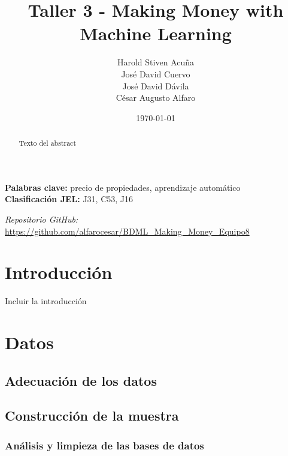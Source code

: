 \documentclass[12pt,a4paper,onecolumn]{article}
\title{\textbf{Taller 3 - Making Money with Machine Learning}}
\author{%
\begin{center}

Harold Stiven Acuña\\
José David Cuervo\\
José David Dávila\\
César Augusto Alfaro
\end{center}%
}
\date{\today}
\begin{document}
\maketitle
\thispagestyle{empty}


\begin{abstract}
Texto del abstract
\end{abstract}

\medskip

\begin{flushleft}
    {\bf Palabras clave:} precio de propiedades, aprendizaje automático \\
    {\bf Clasificación JEL:} J31, C53, J16
\end{flushleft}

\begin{center}
    \textit{Repositorio GitHub:} \url{https://github.com/alfarocesar/BDML_Making_Money_Equipo8}
\end{center}

\pagebreak
\singlespacing
\setlength{\parindent}{0pt}
\setlength{\parskip}{1em}


\section{Introducción}

Incluir la introducción

\section{Datos}

\subsection{Adecuación de los datos}

\subsection{Construcción de la muestra}

\subsubsection{Análisis y limpieza de las bases de datos}
\end{document}
